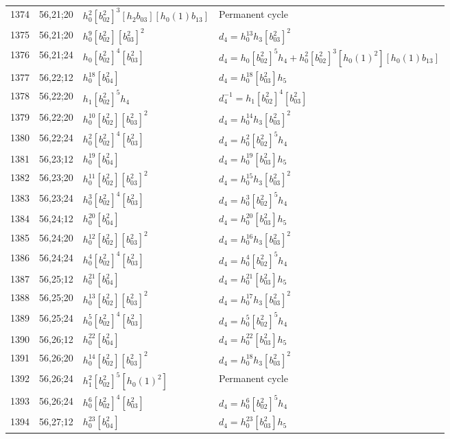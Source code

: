 \documentclass{article}
\begin{document}
\begin{longtable}{|l|l|>{\raggedright\arraybackslash}p{6cm}|>{\raggedright\arraybackslash}p{6cm}|}
\hline
1374 & 56,21;20 & $h_0^2[b_{02}^2]^3[h_2b_{03}][h_0(1)b_{13}]$ & Permanent cycle\\
1375 & 56,21;20 & $h_0^9[b_{02}^2][b_{03}^2]^2$ &$d_{4}=h_0^{13}h_3[b_{03}^2]^2$\\
\hline
1376 & 56,21;24 & $h_0[b_{02}^2]^4[b_{03}^2]$ &$d_{4}=h_0[b_{02}^2]^5h_4 + h_0^2[b_{02}^2]^3[h_0(1)^2][h_0(1)b_{13}]$\\
\hline
1377 & 56,22;12 & $h_0^{18}[b_{04}^2]$ &$d_{4}=h_0^{18}[b_{03}^2]h_5$\\
\hline
1378 & 56,22;20 & $h_1[b_{02}^2]^5h_4$ & $d_{4}^{-1}=h_1[b_{02}^2]^4[b_{03}^2]$\\
1379 & 56,22;20 & $h_0^{10}[b_{02}^2][b_{03}^2]^2$ &$d_{4}=h_0^{14}h_3[b_{03}^2]^2$\\
\hline
1380 & 56,22;24 & $h_0^2[b_{02}^2]^4[b_{03}^2]$ &$d_{4}=h_0^2[b_{02}^2]^5h_4$\\
\hline
1381 & 56,23;12 & $h_0^{19}[b_{04}^2]$ &$d_{4}=h_0^{19}[b_{03}^2]h_5$\\
\hline
1382 & 56,23;20 & $h_0^{11}[b_{02}^2][b_{03}^2]^2$ &$d_{4}=h_0^{15}h_3[b_{03}^2]^2$\\
\hline
1383 & 56,23;24 & $h_0^3[b_{02}^2]^4[b_{03}^2]$ &$d_{4}=h_0^3[b_{02}^2]^5h_4$\\
\hline
1384 & 56,24;12 & $h_0^{20}[b_{04}^2]$ &$d_{4}=h_0^{20}[b_{03}^2]h_5$\\
\hline
1385 & 56,24;20 & $h_0^{12}[b_{02}^2][b_{03}^2]^2$ &$d_{4}=h_0^{16}h_3[b_{03}^2]^2$\\
\hline
1386 & 56,24;24 & $h_0^4[b_{02}^2]^4[b_{03}^2]$ &$d_{4}=h_0^4[b_{02}^2]^5h_4$\\
\hline
1387 & 56,25;12 & $h_0^{21}[b_{04}^2]$ &$d_{4}=h_0^{21}[b_{03}^2]h_5$\\
\hline
1388 & 56,25;20 & $h_0^{13}[b_{02}^2][b_{03}^2]^2$ &$d_{4}=h_0^{17}h_3[b_{03}^2]^2$\\
\hline
1389 & 56,25;24 & $h_0^5[b_{02}^2]^4[b_{03}^2]$ &$d_{4}=h_0^5[b_{02}^2]^5h_4$\\
\hline
1390 & 56,26;12 & $h_0^{22}[b_{04}^2]$ &$d_{4}=h_0^{22}[b_{03}^2]h_5$\\
\hline
1391 & 56,26;20 & $h_0^{14}[b_{02}^2][b_{03}^2]^2$ &$d_{4}=h_0^{18}h_3[b_{03}^2]^2$\\
\hline
1392 & 56,26;24 & $h_1^2[b_{02}^2]^5[h_0(1)^2]$ & Permanent cycle\\
1393 & 56,26;24 & $h_0^6[b_{02}^2]^4[b_{03}^2]$ &$d_{4}=h_0^6[b_{02}^2]^5h_4$\\
\hline
1394 & 56,27;12 & $h_0^{23}[b_{04}^2]$ &$d_{4}=h_0^{23}[b_{03}^2]h_5$\\

\end{longtable}
\end{document}
